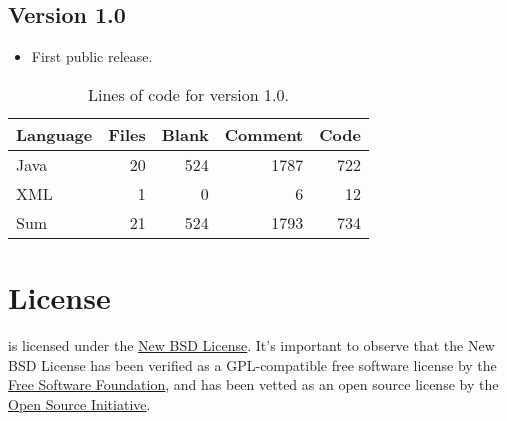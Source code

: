 \documentclass[a4paper,twoside,12pt]{memoir}
\begin{document}
\subsection*{Version 1.0}

\begin{itemize}
\item[\newfeature] First public release.
\end{itemize}

{\renewcommand{\arraystretch}{1.5}
\begin{table}[ht]
\centering
\caption{Lines of code for version 1.0.}
\begin{tabular}{lrrrr}
\hline
\textbf{Language} & \textbf{Files} & \textbf{Blank} & \textbf{Comment} & \textbf{Code}\\
\hline
\hline
Java & 20 & 524 & 1787 & 722\\
XML & 1 & 0 & 6 & 12\\
\hline
Sum & 21 & 524 & 1793 & 734\\
\hline
\end{tabular}
\label{tab:locarara10}
\end{table}}

\cleardoublepage

\section*{License}
\label{sec:license}

\arara is licensed under the 
\href{http://www.opensource.org/licenses/bsd-license.php}{New BSD License}. It's
important to observe that the New BSD License has been verified as a 
GPL-compatible free software license by the 
\href{http://www.fsf.org/}{Free Software Foundation}, and has been vetted as an 
open source license by the 
\href{http://www.opensource.org/}{Open Source Initiative}.

\vspace{1.5em}

\ornamentline

\vfill
\end{document}
